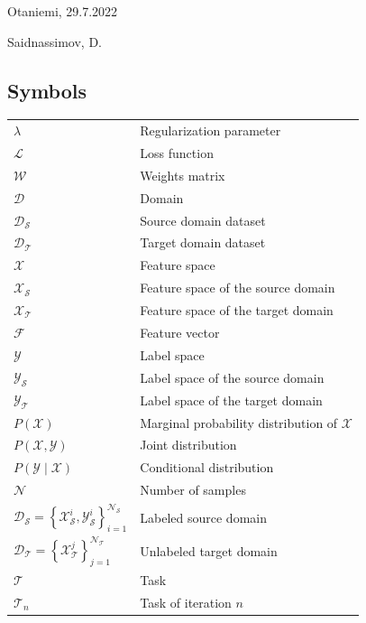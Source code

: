 \documentclass[english, 12pt, a4paper, elec, utf8, a-1b, online]{aaltothesis}
\begin{document}
\vspace{5cm}
Otaniemi, 29.7.2022

\vspace{5mm}
{\hfill Saidnassimov, D.\hspace{1cm}}

\newpage


\thesistableofcontents

\cleardoublepage
\listoffigures
\cleardoublepage

\listoftables
\cleardoublepage


\subsection*{Symbols}

\begin{tabular}{ll}
$\lambda $		& Regularization parameter\\
$\mathcal{L}$	& Loss function  \\
$\mathcal{W}$	& Weights matrix  \\
$\mathcal{D}$	& Domain  \\
$\mathcal{D_S}$	& Source domain dataset \\
$\mathcal{D_T}$	& Target domain dataset  \\
$\mathcal{X}$	& Feature space  \\
$\mathcal{X_S}$	& Feature space of the source domain \\
$\mathcal{X_T}$	& Feature space of the target domain \\
$\mathcal{F}$	& Feature vector\\
$\mathcal{Y}$	& Label space  \\
$\mathcal{Y_S}$	& Label space of the source domain \\
$\mathcal{Y_T}$	& Label space of the target domain \\
$P(\mathcal{X})$	& Marginal probability distribution of $\mathcal{X}$  \\
$P(\mathcal{X}, \mathcal{Y})$	& Joint distribution   \\
$P(\mathcal{Y} \mid \mathcal{X})$	& Conditional distribution  \\
$\mathcal{N}$	& Number of samples\\
$\mathcal{D}_{\mathcal{S}}=\left\{\mathcal{X}_{\mathcal{S}}^{i}, \mathcal{Y}_{\mathcal{S}}^{i}\right\}_{i=1}^{\mathcal{N}_{\mathcal{S}}}$	& Labeled source domain  \\

$\mathcal{D}_{\mathcal{T}}=\left\{\mathcal{X}_{\mathcal{T}}^{j}\right\}_{j=1}^{\mathcal{N}_{\mathcal{T}}}$		& Unlabeled target domain  \\

$\mathcal{T}$	& Task  \\
$\mathcal{T}_{n}$	& Task of iteration $n$  \\
\end{tabular}
\end{document}
